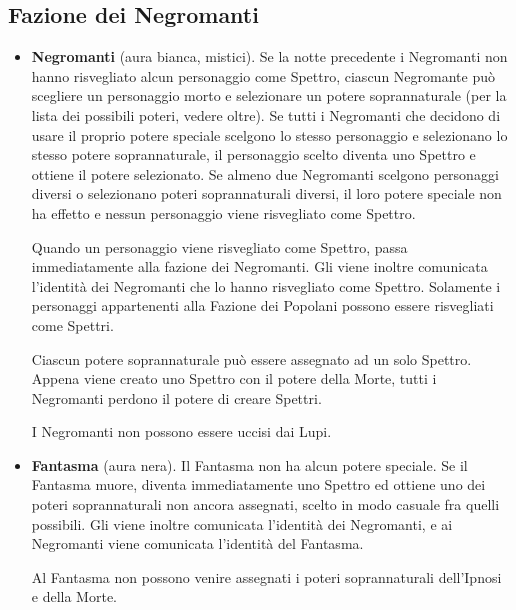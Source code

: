 \documentclass[a4paper,10pt]{article}
\begin{document}
\subsection*{Fazione dei Negromanti}
\label{negromanti}
\begin{itemize}

 \item {\bf Negromanti} (aura bianca, mistici). Se la notte precedente i Negromanti non hanno risvegliato alcun personaggio come Spettro, ciascun Negromante può scegliere un personaggio morto e selezionare un potere soprannaturale (per la lista dei possibili poteri, vedere oltre). Se tutti i Negromanti che decidono di usare il proprio potere speciale scelgono lo stesso personaggio e selezionano lo stesso potere soprannaturale, il personaggio scelto diventa uno Spettro e ottiene il potere selezionato. Se almeno due Negromanti scelgono personaggi diversi o selezionano poteri soprannaturali diversi, il loro potere speciale non ha effetto e nessun personaggio viene risvegliato come Spettro.
 
 Quando un personaggio viene risvegliato come Spettro, passa immediatamente alla fazione dei Negromanti. Gli viene inoltre comunicata l'identità dei Negromanti che lo hanno risvegliato come Spettro.
 Solamente i personaggi appartenenti alla Fazione dei Popolani possono essere risvegliati come Spettri.
 
 Ciascun potere soprannaturale può essere assegnato ad un solo Spettro. Appena viene creato uno Spettro con il potere della Morte, tutti i Negromanti perdono il potere di creare Spettri. 
 
 
 I Negromanti non possono essere uccisi dai Lupi. %

 
 \item {\bf Fantasma} (aura nera). Il Fantasma non ha alcun potere speciale. Se il Fantasma muore, diventa immediatamente uno Spettro ed ottiene uno dei poteri soprannaturali non ancora assegnati, scelto in modo casuale fra quelli possibili. Gli viene inoltre comunicata l'identità dei Negromanti, e ai Negromanti viene comunicata l'identità del Fantasma.
 
 Al Fantasma non possono venire assegnati i poteri soprannaturali dell'Ipnosi e della Morte.
 

\end{itemize}
\end{document}

